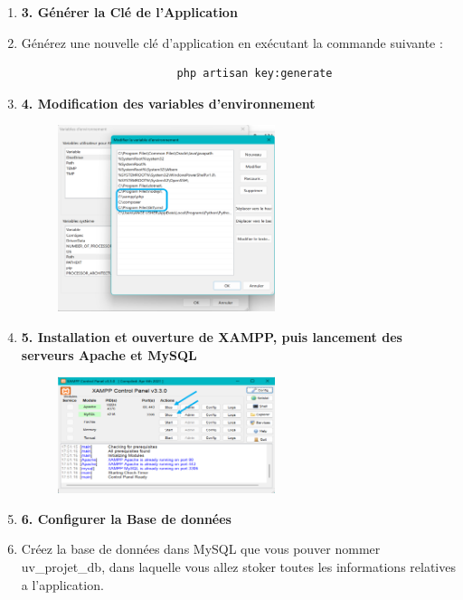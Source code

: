 \documentclass[12pt]{article}
\begin{document}
\begin{enumerate}
\begin{figure}[h]
                        \end{figure}
                \item \textbf{3. Générer la Clé de l'Application}
                    \item Générez une nouvelle clé d'application en exécutant la commande suivante :
                    \begin{lstlisting}    
                        php artisan key:generate
                    \end{lstlisting}
                \item \textbf{4. Modification des variables d’environnement} 
                    \begin{figure}[h] 
                        \centering 
                        \includegraphics[width=0.6\textwidth]{./img/path.png} 
                    \end{figure}
                \item \textbf{{5. Installation et ouverture de XAMPP}, puis lancement des serveurs \textbf{Apache} et \textbf{MySQL}}
                    \begin{figure}[h] 
                        \centering 
                        \includegraphics[width=0.6\textwidth]{./img/xampp.png} 
                    \end{figure}
                \item \textbf{6. Configurer la Base de données}
                    \item Créez la base de données dans MySQL que vous pouver nommer uv_projet_db, dans laquelle vous allez stoker toutes les informations relatives a l'application.

\end{enumerate}
\end{document}
